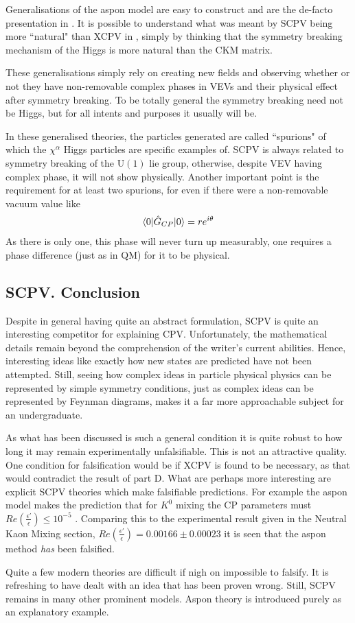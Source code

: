 Generalisations of the aspon model are easy to construct and are the de-facto presentation in \cite{SCPV5}. It is possible to understand what was meant by SCPV being more ``natural" than XCPV in \cite{SCPV1}, simply by thinking that the symmetry breaking mechanism of the Higgs is more natural than the CKM matrix. 


These generalisations simply rely on creating new fields and observing whether or not they have non-removable complex phases in VEVs and their physical effect after symmetry breaking. To be totally general the symmetry breaking need not be Higgs, but for all intents and purposes it usually will be.

In these generalised theories, the particles generated are called ``spurions" of which the $\chi^\alpha$ Higgs particles are specific examples of. SCPV is always related to symmetry breaking of the $\mathrm{U}(1)$ lie group, otherwise, despite VEV having complex phase, it will not show physically. Another important point is the requirement for at least two spurions, for even if there were a non-removable vacuum value like
\begin{align*}
\braket{0|\hat{G}_{CP}|0} = r e^{i\theta}
\end{align*}
As there is only one, this phase will never turn up measurably, one requires a phase difference (just as in QM) for it to be physical.

\subsection{SCPV. Conclusion}
Despite in general having quite an abstract formulation, SCPV is quite an interesting competitor for explaining CPV. Unfortunately, the mathematical details remain beyond the comprehension of the writer's current abilities. Hence, interesting ideas like exactly how new states are predicted have not been attempted. Still, seeing how complex ideas in particle physical physics can be represented by simple symmetry conditions, just as complex ideas can be represented by Feynman diagrams, makes it a far more approachable subject for an undergraduate.

As what has been discussed is such a general condition it is quite robust to how long it may remain experimentally unfalsifiable. This is not an attractive quality. One condition for falsification would be if XCPV is found to be necessary, as that would contradict the result of part D. What are perhaps more interesting are explicit SCPV theories which make falsifiable predictions. For example the aspon model makes the prediction that for $K^0$ mixing the CP parameters must $Re(\frac{\epsilon'}{\epsilon}) \leq 10^{-5}$ \cite{SCPV7}. Comparing this to the experimental result given in the Neutral Kaon Mixing section, $Re(\frac{\epsilon'}{\epsilon})=0.00166 \pm 0.00023$ it is seen that the aspon method \textit{has} been falsified. 

Quite a few modern theories are difficult if nigh on impossible to falsify. It is refreshing to have dealt with an idea that has been proven wrong. Still, SCPV remains in many other prominent models. Aspon theory is introduced purely as an explanatory example.